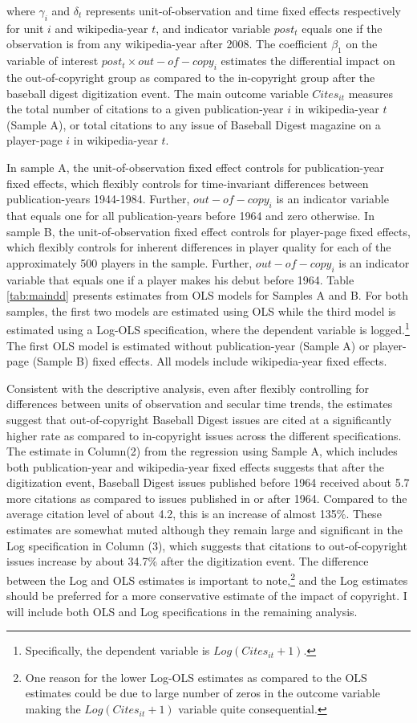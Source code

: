 \documentclass[11pt]{article}
\begin{document}
where $\gamma_{i}$ and $\delta_{t}$ represents unit-of-observation and time fixed effects respectively for unit $i$ and wikipedia-year $t$, and indicator variable $post_t$ equals one if the observation is from any wikipedia-year after 2008. The coefficient $\beta_1$ on the variable of interest $post_t \times out-of-copy_i$ estimates the differential impact on the out-of-copyright group as compared to the in-copyright group after the baseball digest digitization event. The main outcome variable $Cites_{it}$ measures the total number of citations to a given publication-year $i$ in wikipedia-year $t$ (Sample A), or total citations to any issue of Baseball Digest magazine on a player-page $i$ in wikipedia-year $t$. 

In sample A, the unit-of-observation fixed effect controls for publication-year fixed effects, which flexibly controls for time-invariant differences between publication-years 1944-1984. Further, $out-of-copy_i$ is an indicator variable that equals one for all publication-years before 1964 and zero otherwise. In sample B, the unit-of-observation fixed effect controls for player-page fixed effects, which flexibly controls  for inherent differences in player quality for each of the approximately 500 players in the sample. Further, $out-of-copy_i$ is an indicator variable that equals one if a player makes his debut before 1964. Table \ref{tab:maindd} presents estimates from OLS models for Samples A and B. For both samples, the first two models are estimated using OLS while the third model is estimated using a Log-OLS specification, where the dependent variable is logged.\footnote{Specifically, the dependent variable is $Log(Cites_{it}+1)$.} The first OLS model is estimated without publication-year (Sample A) or player-page (Sample B) fixed effects. All models include wikipedia-year fixed effects.

Consistent with the descriptive analysis, even after flexibly controlling for differences between units of observation and secular time trends, the estimates suggest that out-of-copyright Baseball Digest issues are cited at a significantly higher rate as compared to in-copyright issues across the different specifications. The estimate in Column(2) from the regression using Sample A, which includes both publication-year and wikipedia-year fixed effects suggests that after the digitization event, Baseball Digest issues published before 1964 received about 5.7 more citations as compared to issues published in or after 1964. Compared to the average citation level of about 4.2, this is an increase of almost 135\%. These estimates are somewhat muted although they remain large and significant in the Log specification in Column (3), which suggests that citations to out-of-copyright issues increase by about 34.7\% after the digitization event. The difference between the Log and OLS estimates is important to note,\footnote{One reason for the lower Log-OLS estimates as compared to the OLS estimates could be due to large number of zeros in the outcome variable making the $Log(Cites_{it}+1)$ variable quite consequential.} and the Log estimates should be preferred for a more conservative estimate of the impact of copyright. I will include both OLS and Log specifications in the remaining analysis. 
\end{document}
